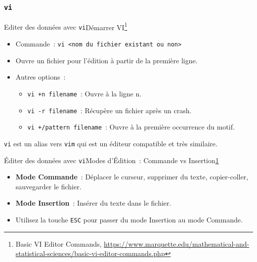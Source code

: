 \documentclass{beamer}
\begin{document}
    \subsubsection{\lstinline{vi}}\label{subsubsec:vi}
    \begin{frame}{Editer des données avec \lstinline{vi}}{Démarrer VI\footnote{\label{marquette-vi}Basic VI Editor Commands, \url{https://www.marquette.edu/mathematical-and-statistical-sciences/basic-vi-editor-commands.php}}}
        \begin{itemize}
            \item Commande~: \lstinline{vi <nom du fichier existant ou non>}
            \item Ouvre un fichier pour l'édition à partir de la première ligne.
            \item Autres options~:
            \begin{itemize}
                \item \lstinline{vi +n filename}~: Ouvre à la ligne n.
                \item \lstinline{vi -r filename}~: Récupère un fichier après un crash.
                \item \lstinline{vi +/pattern filename}~: Ouvre à la première occurrence du motif.
            \end{itemize}
        \end{itemize}
        \begin{dangercolorbox}
            \lstinline{vi} est un alias vers \lstinline{vim} qui est un éditeur compatible et très similaire.
        \end{dangercolorbox}
    \end{frame}

    \begin{frame}{Éditer des données avec \lstinline{vi}}{Modes d'Édition~: Commande vs Insertion\cref{marquette-vi}}
        \begin{itemize}
            \item \textbf{Mode Commande}~: Déplacer le curseur, supprimer du texte, copier-coller, sauvegarder le fichier.
            \item \textbf{Mode Insertion}~: Insérer du texte dans le fichier.
            \item Utilisez la touche \lstinline{ESC} pour passer du mode Insertion au mode Commande.
        \end{itemize}
    \end{frame}
\end{document}
